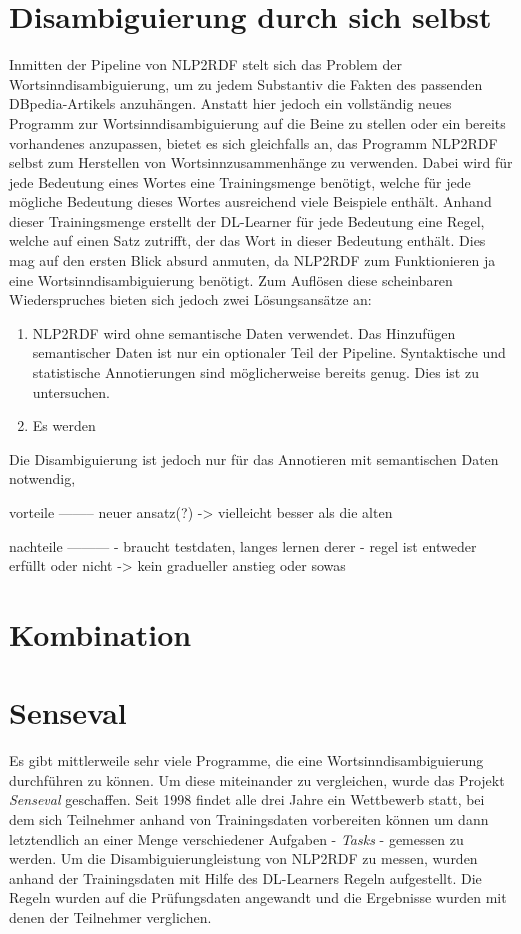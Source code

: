 \section{Disambiguierung durch sich selbst}
Inmitten der Pipeline von NLP2RDF stelt sich das Problem der Wortsinndisambiguierung, um zu jedem Substantiv die Fakten des passenden DBpedia-Artikels anzuhängen.
Anstatt hier jedoch ein vollständig neues Programm zur Wortsinndisambiguierung auf die Beine zu stellen oder ein bereits vorhandenes anzupassen, bietet es sich gleichfalls an, das Programm
 NLP2RDF selbst zum Herstellen von Wortsinnzusammenhänge zu verwenden. 
Dabei wird für jede Bedeutung eines Wortes eine Trainingsmenge benötigt, welche für jede mögliche Bedeutung dieses Wortes ausreichend viele Beispiele enthält.
Anhand dieser Trainingsmenge erstellt der DL-Learner für jede Bedeutung eine Regel, welche auf einen Satz zutrifft, der das Wort in dieser Bedeutung enthält.
Dies mag auf den ersten Blick absurd anmuten, da NLP2RDF zum Funktionieren ja eine Wortsinndisambiguierung benötigt.
Zum Auflösen diese scheinbaren Wiederspruches bieten sich jedoch zwei Lösungsansätze an:
\begin{enumerate}
 \item NLP2RDF wird ohne semantische Daten verwendet.
Das Hinzufügen semantischer Daten ist nur ein optionaler Teil der Pipeline. Syntaktische und statistische Annotierungen sind möglicherweise bereits genug. Dies ist zu untersuchen.
 \item Es werden 
\end{enumerate}

Die Disambiguierung ist jedoch nur für das Annotieren mit semantischen Daten notwendig, 

vorteile
--------
neuer ansatz(?) -> vielleicht besser als die alten

nachteile
---------
- braucht testdaten, langes lernen derer
- regel ist entweder erfüllt oder nicht -> kein gradueller anstieg oder sowas

\section{Kombination}
\section{Senseval}
Es gibt mittlerweile sehr viele Programme, die eine Wortsinndisambiguierung durchführen zu können.
Um diese miteinander zu vergleichen, wurde das Projekt \emph{Senseval} geschaffen.
Seit 1998 findet alle drei Jahre ein Wettbewerb statt, bei dem sich Teilnehmer anhand von Trainingsdaten vorbereiten können um dann letztendlich an einer Menge verschiedener Aufgaben - \emph{Tasks} -
gemessen zu werden. Um die Disambiguierungleistung von NLP2RDF zu messen, wurden anhand der Trainingsdaten mit Hilfe des DL-Learners Regeln aufgestellt.
Die Regeln wurden auf die Prüfungsdaten angewandt und die Ergebnisse wurden mit denen der Teilnehmer verglichen.

